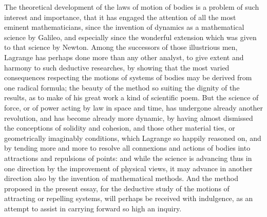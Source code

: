 The theoretical development of the laws of motion of bodies is a
problem of such interest and importance, that it has engaged the
attention of all the most eminent mathematicians, since the
invention of dynamics as a mathematical science by {\sc Galileo},
and especially since the wonderful extension which was given to that
science by {\sc Newton}.  Among the successors of those illustrious
men, {\sc Lagrange} has perhaps done more than any other analyst, to
give extent and harmony to such deductive researches, by showing
that the most varied consequences respecting the motions of
systems of bodies may be derived from one radical formula; the
beauty of the method so suiting the dignity of the results, as to
make of his great work a kind of scientific poem.  But the
science of force, or of power acting by law in space and time,
has undergone already another revolution, and has become already
more dynamic, by having almost dismissed the conceptions of solidity
and cohesion, and those other material ties, or geometrically
imaginably conditions, which {\sc Lagrange} so happily reasoned on,
and by tending more and more to resolve all connexions and actions
of bodies into attractions and repulsions of points: and while the
science is advancing thus in one direction by the improvement of
physical views, it may advance in another direction also by the
invention of mathematical methods.  And the method proposed in
the present essay, for the deductive study of the motions of
attracting or repelling systems, will perhaps be received with
indulgence, as an attempt to assist in carrying forward so high
an inquiry.

